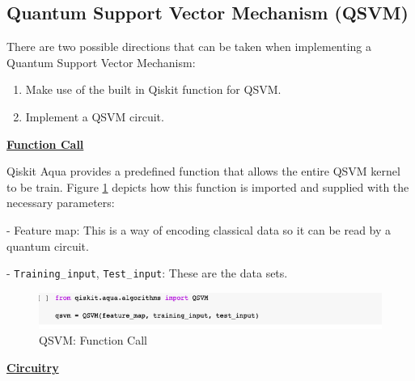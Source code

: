 \subsection{Quantum Support Vector Mechanism (QSVM)}\label{QSVMImp}

There are two possible directions that can be taken when implementing a Quantum Support Vector Mechanism: 

\begin{enumerate}
\item Make use of the built in Qiskit  function for QSVM.


\item Implement a QSVM circuit.
\end{enumerate}

\vspace{0.3cm}
\textbf{\underline{Function Call}}


Qiskit Aqua provides a predefined function that allows the entire QSVM kernel to be train. Figure \ref{SVMCal} depicts how this function is imported and supplied with the necessary parameters:

 - Feature map: This is a way of encoding classical data so it can be read by a quantum circuit. 
 
 - \texttt{Training$_-$input}, \texttt{Test$_-$input}: These are the data sets.
 
 
\begin{figure}[H]
      \centering
      \includegraphics[scale=0.6]{background/SVMImp.png}
      \caption{QSVM: Function Call}
      \label{SVMCal}
\end{figure}

\vspace{0.3cm}
\textbf{\underline{Circuitry}}

